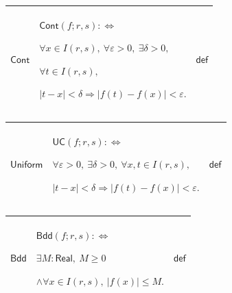 \documentclass[11pt]{amsart}
\newlength{\FTCThreeColumnBody}
\begin{document}
{\begin{tabular}{|@{}>{\centering\arraybackslash}m{0.251968\FTCThreeColumnBody}|>{\centering\arraybackslash}m{0.590551\FTCThreeColumnBody}|>{\centering\arraybackslash}m{0.157480\FTCThreeColumnBody}|}
\end{tabular}%
\par\setlength{\parskip}{0pt}\nointerlineskip
\noindent
\begin{tabular}{|@{}>{\centering\arraybackslash}m{0.251968\FTCThreeColumnBody}|>{\centering\arraybackslash}m{0.590551\FTCThreeColumnBody}|>{\centering\arraybackslash}m{0.157480\FTCThreeColumnBody}|}\hline
\hypertarget{def:Cont}{$\displaystyle \textsf{Cont}$} & $\displaystyle \textsf{Cont}(f;r,s):\Longleftrightarrow$\par
$\displaystyle \forall x\in I(r,s),\ \forall\varepsilon>0,\ \exists\delta>0,$\par
$\displaystyle \forall t\in I(r,s),$\par
$\displaystyle |t-x|<\delta\Rightarrow|f(t)-f(x)|<\varepsilon.$ & $\displaystyle \textsf{def}$\\ \hline
\end{tabular}%
\par\setlength{\parskip}{0pt}\nointerlineskip
\noindent
\begin{tabular}{|@{}>{\centering\arraybackslash}m{0.251968\FTCThreeColumnBody}|>{\centering\arraybackslash}m{0.590551\FTCThreeColumnBody}|>{\centering\arraybackslash}m{0.157480\FTCThreeColumnBody}|}\hline
\hypertarget{def:Uniform}{$\displaystyle \textsf{Uniform}$} & $\displaystyle \textsf{UC}(f;r,s):\Longleftrightarrow$\par
$\displaystyle \forall\varepsilon>0,\ \exists\delta>0,\ \forall x,t\in I(r,s),$\par
$\displaystyle |t-x|<\delta\Rightarrow|f(t)-f(x)|<\varepsilon.$ & $\displaystyle \textsf{def}$\\ \hline
\end{tabular}%
\par\setlength{\parskip}{0pt}\nointerlineskip
\noindent
\begin{tabular}{|@{}>{\centering\arraybackslash}m{0.251968\FTCThreeColumnBody}|>{\centering\arraybackslash}m{0.590551\FTCThreeColumnBody}|>{\centering\arraybackslash}m{0.157480\FTCThreeColumnBody}|}\hline
\hypertarget{def:Bdd}{$\displaystyle \textsf{Bdd}$} & $\displaystyle \textsf{Bdd}(f;r,s):\Longleftrightarrow$\par
$\displaystyle \exists M:\textsf{Real},\ M\ge0$\par
$\displaystyle \land\forall x\in I(r,s),\ |f(x)|\le M.$ & $\displaystyle \textsf{def}$\\ \hline
\end{tabular}%
\par\setlength{\parskip}{0pt}\nointerlineskip
}
\end{document}
